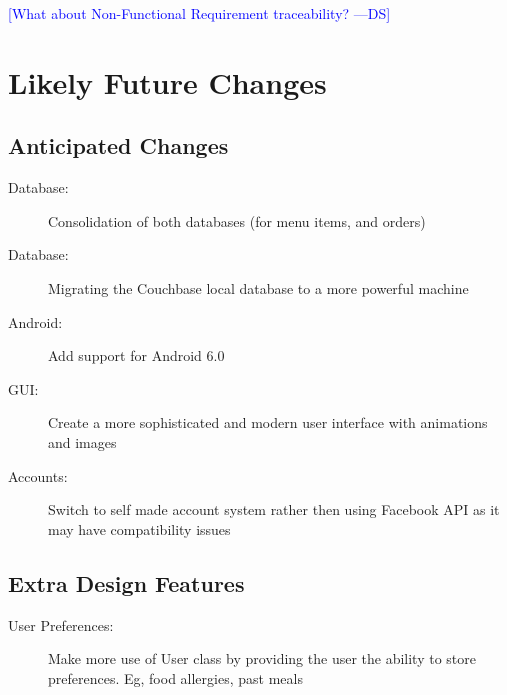 \documentclass[12pt, titlepage]{article}
\newcommand{\authornote}[3]{\textcolor{#1}{[#3 ---#2]}}
\newcommand{\authornote}[3]{}
\newcommand{\ds}[1]{\authornote{blue}{DS}{#1}}
\begin{document}
\ds{What about Non-Functional Requirement traceability?}

\section{Likely Future Changes}
\subsection{Anticipated Changes}
\begin{description}
  \item[Database:] Consolidation of both databases (for menu items, and orders)
  \item[Database:] Migrating the Couchbase local database to a more powerful machine
  \item[Android:] Add support for Android 6.0
  \item[GUI:] Create a more sophisticated and modern user interface with animations and images
  \item[Accounts:] Switch to self made account system rather then using Facebook API as it may have compatibility issues
 \end{description}
 
\subsection{Extra Design Features}
\begin{description}
  \item[User Preferences:] Make more use of User class by providing the user the ability to store preferences. Eg, food allergies, past meals
\end{description}
\end{document}
